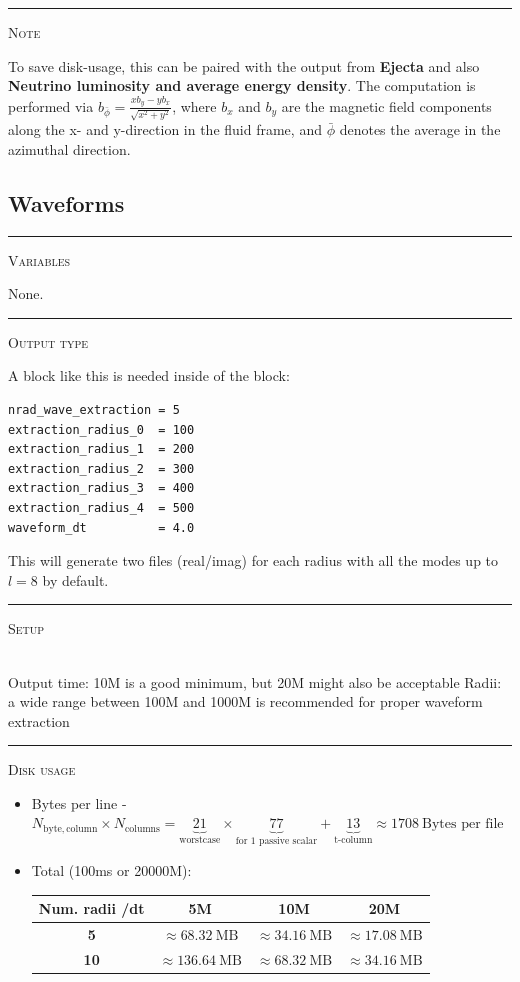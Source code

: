 \documentclass{article}
\newcommand{\var}[1]{%
  {\setlength{\fboxsep}{1.5pt}%
   \colorbox{varbg}{\textcolor{varfg}{\texttt{\small #1}}}}}
\newcommand{\step}[1]{%
  \par\medskip\noindent
  {\color{stepfg}\rule[-0.15ex]{2pt}{1.5ex}\hspace{0.5em}\scshape #1}%
  \hspace{0.75em}\ignorespaces}
\begin{document}
\step{Note}
To save disk-usage, this can be paired with the output from \textbf{Ejecta} and also
\textbf{Neutrino luminosity and average energy density}. The computation is performed via $b_{\bar{\phi}}=\frac{xb_y-yb_x}{\sqrt{x^2+y^2}}$,
where $b_x$ and $b_y$ are the magnetic field components along the x- and y-direction in the fluid frame, and $\bar{\phi}$ denotes the average
in the azimuthal direction.

\subsection*{Waveforms}
\step{Variables} None.
\step{Output type}
A block like this is needed inside of the \var{<z4c>} block:
\begin{verbatim}
nrad_wave_extraction = 5
extraction_radius_0  = 100
extraction_radius_1  = 200
extraction_radius_2  = 300
extraction_radius_3  = 400
extraction_radius_4  = 500
waveform_dt          = 4.0
\end{verbatim}
This will generate two files (real/imag) for each radius with all the modes up to $l=8$ by default.

\step{Setup}\mbox{}\\
Output time: 10M is a good minimum, but 20M might also be acceptable
Radii: a wide range between 100M and 1000M is recommended for proper waveform extraction

\step{Disk usage}
\begin{itemize}
  \item Bytes per line - $N_{\mathrm{byte, column}}\times N_{\mathrm{columns}}=\underbrace{21}_{\text{worstcase}}\times \underbrace{77}_{\text{for 1 passive scalar}}+\underbrace{13}_{\text{t-column}}\approx 1708\ \text{Bytes per file}$
  \item Total (100ms or 20000M):
  \begin{raggedleft}
    \begin{tabular}{|c|c|c|c|}
      \hline
      \textbf{Num. radii \slash dt}&\textbf{5M}&\textbf{10M}&\textbf{20M}\\
      \hline
      \textbf{5}&$\approx 68.32\ \mathrm{MB}$&$\approx 34.16\ \mathrm{MB}$&$\approx 17.08\ \mathrm{MB}$\\
      \hline
      \textbf{10}&$\approx 136.64\ \mathrm{MB}$&$\approx 68.32\ \mathrm{MB}$&$\approx 34.16\ \mathrm{MB}$\\
      \hline
    \end{tabular}
  \end{raggedleft}
\end{itemize}
\end{document}
